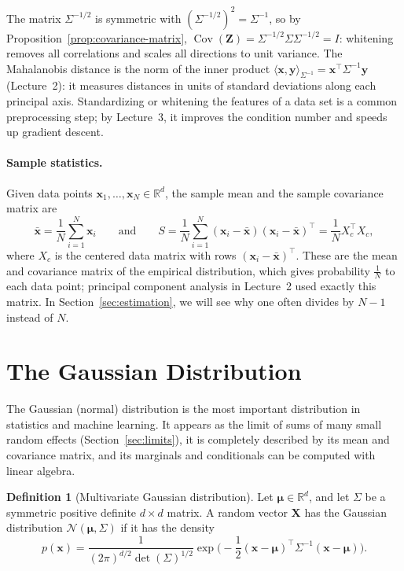 \documentclass[11pt]{article}
\newcommand{\ip}[2]{\langle #1, #2 \rangle}
\DeclareMathOperator{\Cov}{Cov}
\theoremstyle{definition}
\newtheorem{definition}{Definition}[section]
\theoremstyle{plain}
\theoremstyle{remark}
\begin{document}
The matrix $\Sigma^{-1/2}$ is symmetric with $(\Sigma^{-1/2})^2 = \Sigma^{-1}$, so by Proposition~\ref{prop:covariance-matrix}, $\Cov(\mathbf{Z}) = \Sigma^{-1/2}\Sigma\Sigma^{-1/2} = I$: whitening removes all correlations and scales all directions to unit variance. The Mahalanobis distance is the norm of the inner product $\ip{\mathbf{x}}{\mathbf{y}}_{\Sigma^{-1}} = \mathbf{x}^\top\Sigma^{-1}\mathbf{y}$ (Lecture~2): it measures distances in units of standard deviations along each principal axis. Standardizing or whitening the features of a data set is a common preprocessing step; by Lecture~3, it improves the condition number and speeds up gradient descent.

\paragraph{Sample statistics.} Given data points $\mathbf{x}_1, \ldots, \mathbf{x}_N \in \mathbb{R}^d$, the sample mean and the sample covariance matrix are
\[\bar{\mathbf{x}} = \frac{1}{N}\sum_{i=1}^N \mathbf{x}_i \qquad \text{and} \qquad S = \frac{1}{N}\sum_{i=1}^N (\mathbf{x}_i - \bar{\mathbf{x}})(\mathbf{x}_i - \bar{\mathbf{x}})^\top = \frac{1}{N}X_c^\top X_c,\]
where $X_c$ is the centered data matrix with rows $(\mathbf{x}_i - \bar{\mathbf{x}})^\top$. These are the mean and covariance matrix of the empirical distribution, which gives probability $\frac{1}{N}$ to each data point; principal component analysis in Lecture~2 used exactly this matrix. In Section~\ref{sec:estimation}, we will see why one often divides by $N - 1$ instead of $N$.

\section{The Gaussian Distribution}\label{sec:gaussian}

The Gaussian (normal) distribution is the most important distribution in statistics and machine learning. It appears as the limit of sums of many small random effects (Section~\ref{sec:limits}), it is completely described by its mean and covariance matrix, and its marginals and conditionals can be computed with linear algebra.

\begin{definition}[Multivariate Gaussian distribution]\label{def:gaussian}
    Let $\boldsymbol{\mu} \in \mathbb{R}^d$, and let $\Sigma$ be a symmetric positive definite $d \times d$ matrix. A random vector $\mathbf{X}$ has the Gaussian distribution $\mathcal{N}(\boldsymbol{\mu}, \Sigma)$ if it has the density
    \[p(\mathbf{x}) = \frac{1}{(2\pi)^{d/2}\det(\Sigma)^{1/2}}\exp\Big(-\frac{1}{2}(\mathbf{x} - \boldsymbol{\mu})^\top\Sigma^{-1}(\mathbf{x} - \boldsymbol{\mu})\Big).\]
\end{definition}
\end{document}
